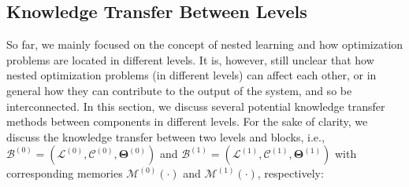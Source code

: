 \documentclass{article}
\newcommand{\M}[0]{\mathcal{M}}
\begin{document}
 
\subsection{Knowledge Transfer Between Levels}\label{sec:knowledge-transfer}
So far, we mainly focused on the concept of nested learning and how optimization problems are located in different levels. It is, however, still unclear that how nested optimization problems (in different levels) can affect each other, or in general how they can contribute to the output of the system, and so be interconnected. In this section, we discuss several potential knowledge transfer methods between components in different levels. For the sake of clarity, we discuss the knowledge transfer between two levels and blocks, i.e., $\mathcal{B}^{(0)} = (\mathcal{L}^{(0)}, \mathcal{C}^{(0)}, \boldsymbol{\Theta}^{(0)})$ and $\mathcal{B}^{(1)} = (\mathcal{L}^{(1)}, \mathcal{C}^{(1)}, \boldsymbol{\Theta}^{(1)})$ with corresponding memories $\M^{(0)}(\cdot)$ and $\M^{(1)}(\cdot)$, respectively:
\end{document}
